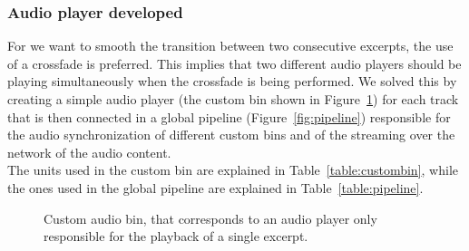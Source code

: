 \subsubsection*{Audio player developed}
\label{subsec:audioplayer}
For we want to smooth the transition between two consecutive excerpts, the use of a crossfade is preferred. This implies that two different audio players should be playing simultaneously when the crossfade is being performed. We solved this by creating a simple audio player (the custom bin shown in Figure~\ref{fig:custombin}) for each track that is then connected in a global pipeline (Figure~\ref{fig:pipeline}) responsible for the audio synchronization of different custom bins and of the streaming over the network of the audio content. \\ The units used in the custom bin are explained in Table~\ref{table:custombin}, while the ones used in the global pipeline are explained in Table~\ref{table:pipeline}. \\

\begin{figure}[h]
\caption[Custom audio bin]{Custom audio bin, that corresponds to an audio player only responsible for the playback of a single excerpt.}
\label{fig:custombin}
\end{figure}

\makeatletter
\newcommand\footnoteref[1]{\protected@xdef\@thefnmark{\ref{#1}}\@footnotemark}
\makeatother

